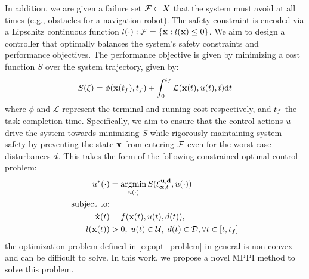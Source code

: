 In addition, we are given a failure set $\mathcal{F} \subset X$ that the system must avoid at all times (e.g., obstacles for a navigation robot). The safety constraint is encoded via a Lipschitz continuous function $
l (\cdot): \mathcal{F}= \{\mathbf{x} : l(\mathbf{x})\leq 0\}$.
We aim to design a controller that optimally balances the system's safety constraints and performance objectives. The performance objective is given by minimizing a cost function $S$ over the system trajectory, given by:
%
\begin{equation}    S(\xi)=\phi(\mathbf{x}(t_{f}),t_{f})+\int_{0}^{t_{f}}{\mathcal{L}}(\mathbf{x}(t),u(t),t)\mathrm{d}t
\end{equation}
%
where $\phi$ and $\mathcal{L}$ represent the terminal and running cost respectively, and $t_{f}$ the task completion time.
Specifically, we aim to ensure that the control actions $u$ drive the system towards minimizing $S$ while rigorously maintaining system safety by preventing the state $\mathbf{x}$ from entering $\mathcal{F}$ even for the worst case disturbances $d$. This takes the form of the following constrained optimal control problem:
%
\begin{equation}\label{eq:opt_problem}
\begin{aligned}
    \ctrl^{*}(\cdot)&=\argmin_{\ctrl(\cdot)}S(\traj_{\state,\tvar}^{\ctrlseq,\mathbf{\dstb}},\ctrl(\cdot)) \\ 
    \text{subject to:}& \\
    \dot{\state}(t) &= \dyn(\state(t), \ctrl(t), \dstb(t)), \\
    \quad \;\targetfunc(\state(\tvar))& > 0, 
    \;\ctrl(t) \in \cset, 
    \;\dstb(t) \in \dset,
   \forall t \in [\tvar, \tvar_f]
\end{aligned}
\end{equation}
%
\noindent the optimization problem defined in \eqref{eq:opt_problem} in general is non-convex and can be difficult to solve. In this work, we propose a novel MPPI method to solve this problem.
